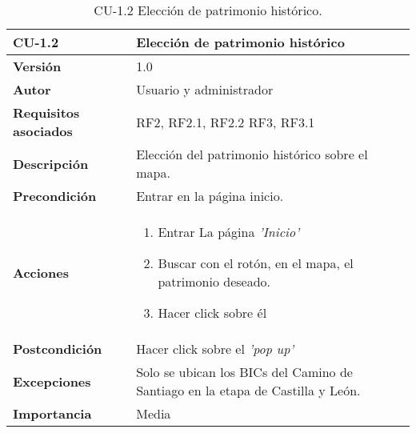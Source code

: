 \begin{table}[h!]
	\centering
	\begin{tabularx}{\linewidth}{ p{} p{} }
		\toprule
		\textbf{CU-1.2}    & \textbf{Elección de patrimonio histórico}\\
		\toprule
		\textbf{Versión}              & 1.0    \\
		\textbf{Autor}                & Usuario y administrador \\
		\textbf{Requisitos asociados} & RF2, RF2.1, RF2.2 RF3, RF3.1\\
		\textbf{Descripción}          & Elección del patrimonio histórico sobre el mapa. \\
		\textbf{Precondición}         & Entrar en la página inicio. \\
		\textbf{Acciones}             &
		\begin{enumerate}
			\def\labelenumi{\arabic{enumi}.}
			\tightlist
			\item Entrar La página \textit{'Inicio'}
			\item Buscar con el rotón, en el mapa, el patrimonio deseado.
            \item Hacer click sobre él
		\end{enumerate}\\
		\textbf{Postcondición}        &  Hacer click sobre el \textit{'pop up'}\\
		\textbf{Excepciones}          &  Solo se ubican los BICs del Camino de Santiago en la etapa de Castilla y León.\\
		\textbf{Importancia}          & Media \\
		\bottomrule
	\end{tabularx}
	\caption{CU-1.2 Elección de patrimonio histórico.}
\end{table}

